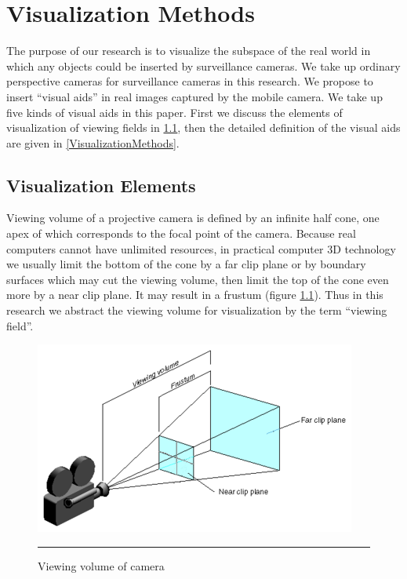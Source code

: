 \chapter{Visualization Methods}
\label{Chapter2}

The purpose of our research is to visualize the subspace of the real world in which any objects could be inserted by surveillance cameras. We take up ordinary perspective cameras for surveillance cameras in this research. We propose to insert ``visual aids'' in real images captured by the mobile camera. We take up five kinds of visual aids in this paper. First we discuss the elements of visualization of viewing fields in \ref{VisualizationRequirements}, then the detailed definition of the visual aids are given in \ref{VisualizationMethods}.


\section{Visualization Elements}
\label{VisualizationRequirements}

Viewing volume of a projective camera is defined by an infinite half cone, one apex of which corresponds to the focal point of the camera. Because real computers cannot have unlimited resources, in practical computer 3D technology we usually limit the bottom of the cone by a far clip plane or by boundary surfaces which may cut the viewing volume, then limit the top of the cone even more by a near clip plane. It may result in a frustum (figure \ref{fig:ViewingVolume}). Thus in this research we abstract the viewing volume for visualization by the term ``viewing field''.

\begin{figure}[htbp]
	\centering
	\includegraphics{./Primitives/viewing_volume.png}
	\rule{35em}{0.5pt}
	\caption[Viewing volume of camera]{Viewing volume of camera}
	\label{fig:ViewingVolume}
\end{figure}

